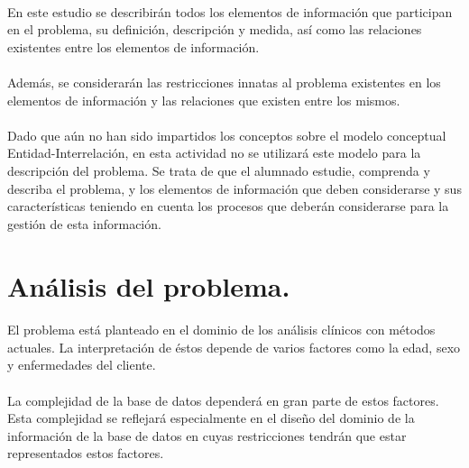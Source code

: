 \documentclass[a4paper,10pt]{article}
\begin{document}
\paragraph{}
En este estudio se describirán todos los elementos de información que participan en el problema, su definición, descripción y medida, así como las relaciones existentes entre los elementos de información.
\paragraph{}
Además, se considerarán las restricciones innatas al problema existentes en los elementos de información y las relaciones que existen entre los mismos.
\paragraph{}
Dado que aún no han sido impartidos los conceptos sobre el modelo conceptual Entidad-Interrelación, en esta actividad no se utilizará este modelo para la descripción del problema. Se trata de que el alumnado estudie, comprenda y describa el problema, y los elementos de información que deben considerarse y sus características teniendo en cuenta los procesos que deberán considerarse para la gestión de esta información.
\pagebreak

\section{Análisis del problema.}
\paragraph{}
El problema está planteado en el dominio de los análisis clínicos con métodos actuales. La interpretación de éstos depende de varios factores como la edad, sexo y enfermedades del cliente.
\paragraph{}
La complejidad de la base de datos dependerá en gran parte de estos factores. Esta complejidad se reflejará especialmente en el diseño del dominio de la información de la base de datos en cuyas restricciones tendrán que estar representados estos factores.

\end{document}
